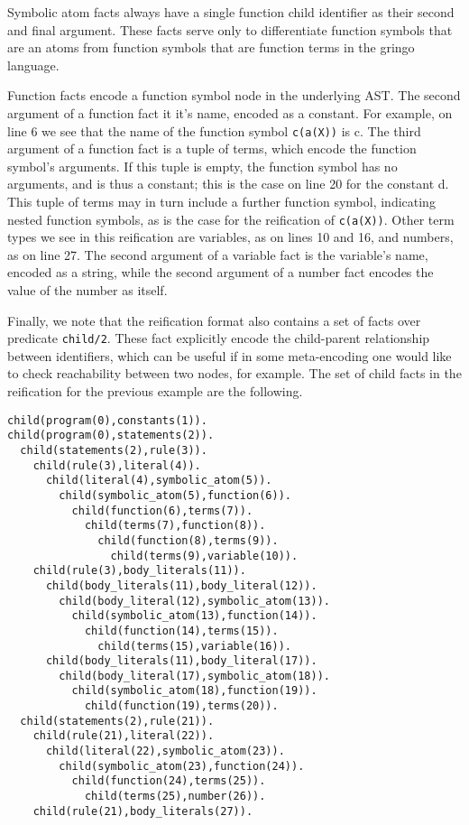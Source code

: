 Symbolic atom facts always have a single function child identifier as
their second and final argument. These facts serve only to
differentiate function symbols that are an atoms from function symbols
that are function terms in the gringo language.

Function facts encode a function symbol node in the underlying
AST. The second argument of a function fact it it's name, encoded as a
constant. For example, on line 6 we see that the name of the function
symbol \texttt{c(a(X))} is c. The third argument of a function fact is
a tuple of terms, which encode the function symbol's arguments. If
this tuple is empty, the function symbol has no arguments, and is thus
a constant; this is the case on line 20 for the constant d. This tuple
of terms may in turn include a further function symbol, indicating
nested function symbols, as is the case for the reification of
\texttt{c(a(X))}. Other term types we see in this reification are
variables, as on lines 10 and 16, and numbers, as on line 27. The
second argument of a variable fact is the variable's name, encoded as
a string, while the second argument of a number fact encodes the value
of the number as itself.

Finally, we note that the reification format also contains a set of
facts over predicate \texttt{child/2}. These fact explicitly encode
the child-parent relationship between identifiers, which can be useful
if in some meta-encoding one would like to check reachability between
two nodes, for example. The set of child facts in the reification for
the previous example are the following.

\begin{lstlisting}[language=clingo]
child(program(0),constants(1)).
child(program(0),statements(2)).
  child(statements(2),rule(3)).
    child(rule(3),literal(4)).
      child(literal(4),symbolic_atom(5)).
        child(symbolic_atom(5),function(6)).
          child(function(6),terms(7)).
            child(terms(7),function(8)).
              child(function(8),terms(9)).
                child(terms(9),variable(10)).
    child(rule(3),body_literals(11)).
      child(body_literals(11),body_literal(12)).
        child(body_literal(12),symbolic_atom(13)).
          child(symbolic_atom(13),function(14)).
            child(function(14),terms(15)).
              child(terms(15),variable(16)).
      child(body_literals(11),body_literal(17)).
        child(body_literal(17),symbolic_atom(18)).
          child(symbolic_atom(18),function(19)).
            child(function(19),terms(20)).
  child(statements(2),rule(21)).
    child(rule(21),literal(22)).
      child(literal(22),symbolic_atom(23)).
        child(symbolic_atom(23),function(24)).
          child(function(24),terms(25)).
            child(terms(25),number(26)).
    child(rule(21),body_literals(27)).
\end{lstlisting}

